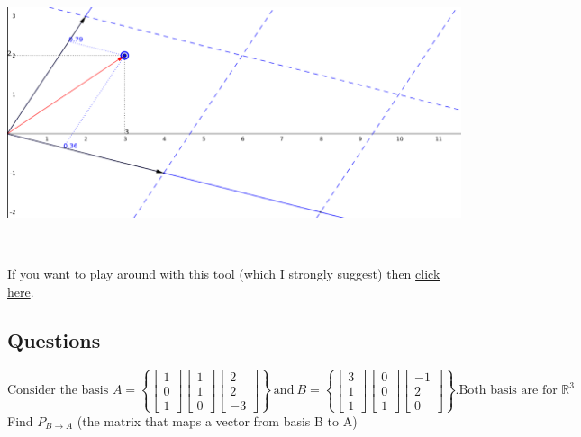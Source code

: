 \documentclass[14pt]{article}
\begin{document}
\begin{center}
	\includegraphics[height=8cm,keepaspectratio]{"./Pictures/Basis_1.png"}
\end{center}
If you want to play around with this tool (which I strongly suggest) then \href{https://www.geogebra.org/m/NNVtN9aW}{click here}.
\subsection{Questions}
\[
\text{Consider the basis }
A = 
\left\{
	\begin{bmatrix}
	1 \\ 0 \\ 1
	\end{bmatrix}
	\begin{bmatrix}
	1 \\ 1 \\ 0
	\end{bmatrix}
	\begin{bmatrix}
	2 \\ 2 \\ -3
	\end{bmatrix}
\right\}
\ \text{and} \
B = 
\left\{
\begin{bmatrix}
3 \\ 1 \\ 1
\end{bmatrix}
\begin{bmatrix}
0 \\ 0 \\ 1
\end{bmatrix}
\begin{bmatrix}
-1 \\ 2 \\ 0
\end{bmatrix}
\right\}
\text{.Both basis are for } \mathbb{R}^3
\]
Find $P_{B \rightarrow A}$ (the matrix that maps a vector from basis B to A)
\end{document}
